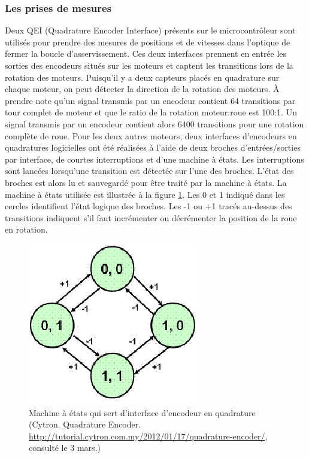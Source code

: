 \subsubsection{Les prises de mesures}
\label{asservissement_mesures}
Deux QEI (Quadrature Encoder Interface) présents sur le microcontrôleur sont utilisés pour prendre des mesures de positions et de vitesses dans l'optique de fermer la boucle d'asservissement. Ces deux interfaces prennent en entrée les sorties des encodeurs situés sur les moteurs et captent les transitions lors de la rotation des moteurs. Puisqu'il y a deux capteurs placés en quadrature sur chaque moteur, on peut détecter la direction de la rotation des moteurs. À prendre note qu'un signal transmis par un encodeur contient 64 transitions par tour complet de moteur et que le ratio de la rotation moteur:roue est 100:1. Un signal transmis par un encodeur contient alors 6400 transitions pour une rotation complète de roue. Pour les deux autres moteurs, deux interfaces d'encodeurs en quadratures logicielles ont été réalisées à l'aide de deux broches d'entrées/sorties par interface, de courtes interruptions et d'une machine à états. Les interruptions sont lancées lorsqu'une transition est détectée sur l'une des broches. L'état des broches est alors lu et sauvegardé pour être traité par la machine à états. La machine à états utilisée est illustrée à la figure \ref{fig:cytron_machine_etats}. Les 0 et 1 indiqué dans les cercles identifient l'état logique des broches. Les -1 ou +1 tracés au-dessus des transitions indiquent s'il faut incrémenter ou décrémenter la position de la roue en rotation.
\begin{figure}[htbp]
\centering
\includegraphics[scale=0.7]{fig/cytron_machine_etats.png}
\caption{Machine à états qui sert d'interface d'encodeur en quadrature (Cytron. Quadrature Encoder. \url{http://tutorial.cytron.com.my/2012/01/17/quadrature-encoder/}, consulté le 3 mars.)}
\label{fig:cytron_machine_etats}
\end{figure}
